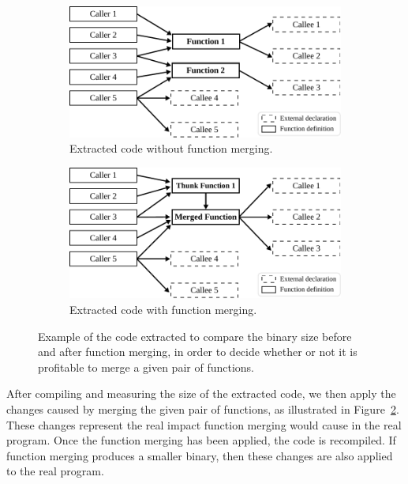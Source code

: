 \begin{figure}[h]
\centering
\begin{subfigure}{0.45\textwidth}
  \centering
  \includegraphics[scale=0.6]{src/deeplearning/figs/our-cost-model-callgraph-1.pdf}
  \caption{Extracted code without function merging.}
  \label{fig:our-cost-model-callgraph-1}
\end{subfigure}
\begin{subfigure}{0.45\textwidth}
\centering
  \includegraphics[scale=0.6]{src/deeplearning/figs/our-cost-model-callgraph-2.pdf}
  \caption{Extracted code with function merging.}
  \label{fig:our-cost-model-callgraph-2}
\end{subfigure}
\caption{Example of the code extracted to compare the binary size before and after function merging, in order to decide whether or not it is profitable to merge a given pair of functions.}
\label{fig:our-cost-model-callgraphs}
\end{figure}

After compiling and measuring the size of the extracted code, we then apply the changes caused by merging the given pair of functions, as illustrated in Figure~\ref{fig:our-cost-model-callgraph-2}.
These changes represent the real impact function merging would cause in the real program.
Once the function merging has been applied, the code is recompiled.
If function merging produces a smaller binary, then these changes are also applied to the real program.

